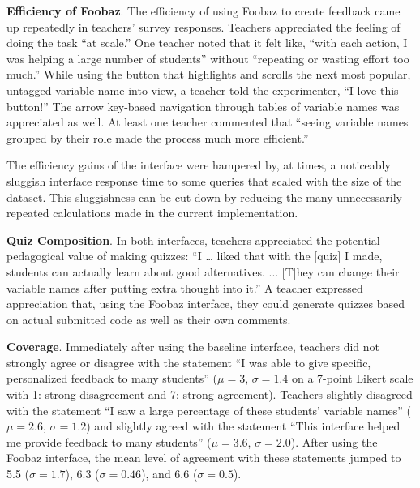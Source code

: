 {{\textbf{Efficiency of Foobaz}. The efficiency of using Foobaz to create feedback came up repeatedly in teachers' survey responses. Teachers appreciated the feeling of doing the task ``at scale.'' One teacher noted that it felt like, ``with each action, I was helping a large number of students'' without ``repeating or wasting effort too much.'' While using the button that highlights and scrolls the next most popular, untagged variable name into view, a teacher told the experimenter, ``I love this button!'' The arrow key-based navigation through tables of variable names was appreciated as well. At least one teacher commented that ``seeing variable names grouped by their role made the process much more efficient.'' 

The efficiency gains of the interface were hampered by, at times, a noticeably sluggish interface response time to some queries that scaled with the size of the dataset. This sluggishness can be cut down by reducing the many unnecessarily repeated calculations made in the current implementation.

\textbf{Quiz Composition}. In both interfaces, teachers appreciated the potential pedagogical value of making quizzes: ``I … liked that with the [quiz] I made, students can actually learn about good alternatives. ... [T]hey can change their variable names after putting extra thought into it.'' A teacher expressed appreciation that, using the Foobaz interface, they could generate quizzes based on actual submitted code as well as their own comments. 

\textbf{Coverage}. Immediately after using the baseline interface, teachers did not strongly agree or disagree with the statement ``I was able to give specific, personalized feedback to many students'' ($\mu =3$, $\sigma = 1.4$ on a 7-point Likert scale with 1: strong disagreement and 7: strong agreement). Teachers slightly disagreed with the statement ``I saw a large percentage of these students' variable names'' ($\mu=2.6$, $\sigma = 1.2$) and slightly agreed with the statement ``This interface helped me provide feedback to many students'' ($\mu=3.6$, $\sigma = 2.0$). After using the Foobaz interface, the mean level of agreement with these statements jumped to 5.5 ($\sigma = 1.7$), 6.3 ($\sigma = 0.46$), and 6.6 ($\sigma = 0.5$).

}}
